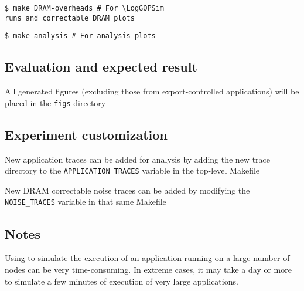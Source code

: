 \begin{Verbatim}[commandchars=\\\{\},frame=single]
  $ make DRAM-overheads # For \LogGOPSim
runs and correctable DRAM plots
\end{Verbatim}

\begin{Verbatim}[commandchars=\\\{\},frame=single]
  $ make analysis # For analysis plots
\end{Verbatim}

\subsection{Evaluation and expected result}

All generated figures (excluding those from export-controlled applications) will
be placed in the {\texttt{figs}} directory

\subsection{Experiment customization}

New application traces can be added for analysis by adding the new trace
directory to the {\texttt{APPLICATION\_TRACES}} variable in the top-level Makefile

New DRAM correctable noise traces can be added by modifying the
{\texttt{NOISE\_TRACES}} variable in that same Makefile

\subsection{Notes}

Using \LogGOPSim to simulate the execution of an application running on 
a large number of nodes can be very time-consuming.  In extreme cases,
it may take a day or more to simulate a few minutes of execution of
very large applications.

